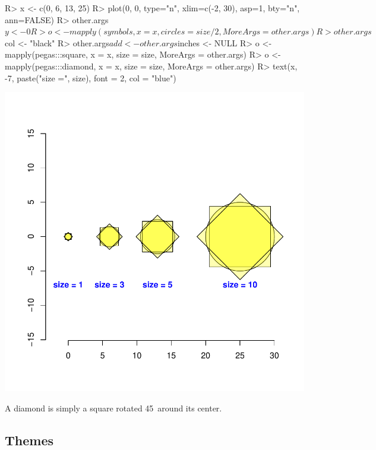 \documentclass[a4paper]{article}
\begin{document}
\begin{Schunk}
\begin{Sinput}
R> x <- c(0, 6, 13, 25)
R> plot(0, 0, type="n", xlim=c(-2, 30), asp=1, bty="n", ann=FALSE)
R> other.args$y <- 0
R> o <- mapply(symbols, x = x, circles = size/2, MoreArgs = other.args)
R> other.args$col <- "black"
R> other.args$add <- other.args$inches <- NULL
R> o <- mapply(pegas:::square, x = x, size = size, MoreArgs = other.args)
R> o <- mapply(pegas:::diamond, x = x, size = size, MoreArgs = other.args)
R> text(x, -7, paste("size =", size), font = 2, col = "blue")
\end{Sinput}
\end{Schunk}
\includegraphics{PlotHaploNet-004}

\noindent A diamond is simply a square rotated 45\textdegree\ around its center.

\subsection{Themes}
\end{document}
